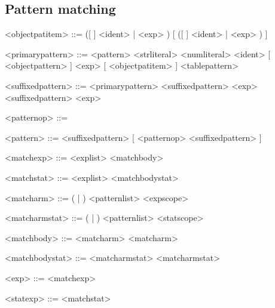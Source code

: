 \documentclass{article}
\newenvironment{bnf}
{
\begin{mdframed}
\begin{grammar}
}
{
\end{grammar}
\end{mdframed}
}
\begin{document}
\subsection{Pattern matching}
\begin{bnf}
<objectpatitem> ::= ([ \lit{\$} ] <ident> | \lit{\$(} <exp> \lit{)})
    [ \lit{:} ([ \lit{\$} ] <ident> | \lit{\$(} <exp> \lit{)}) ]

<primarypattern> ::= \lit{(} <pattern> \lit{)}
    \alt <strliteral>
    \alt <numliteral>
    \alt {}
    \alt {}
    \alt {}
    \alt [ \lit{\$} ] <ident> [ \lit{(} { <objectpattern> } \lit{)} ]
    \alt \lit{\$(} <exp> \lit{)} [ \lit{(} { <objectpatitem> } \lit{)} ]
    \alt <tablepattern>

<suffixedpattern> ::= <primarypattern>
    \alt <suffixedpattern>  <exp>
    \alt <suffixedpattern>  <exp>

<patternop> ::= 
    \alt {}
    \alt \lit{::}

<pattern> ::= <suffixedpattern> [ <patternop> <suffixedpattern> ]

<matchexp> ::=  <explist> \lit{->} <matchbody>

<matchstat> ::=  <explist> \lit{->} <matchbodystat>

<matcharm> ::= (\lit{|} | ) <patternlist> <expscope>

<matcharmstat> ::= (\lit{|} | ) <patternlist> <statscope>

<matchbody> ::= <matcharm> { <matcharm> }

<matchbodystat> ::= <matcharmstat> { <matcharmstat> }

<exp> ::= <matchexp>

<statexp> ::= <matchstat>
\end{bnf}
\end{document}
